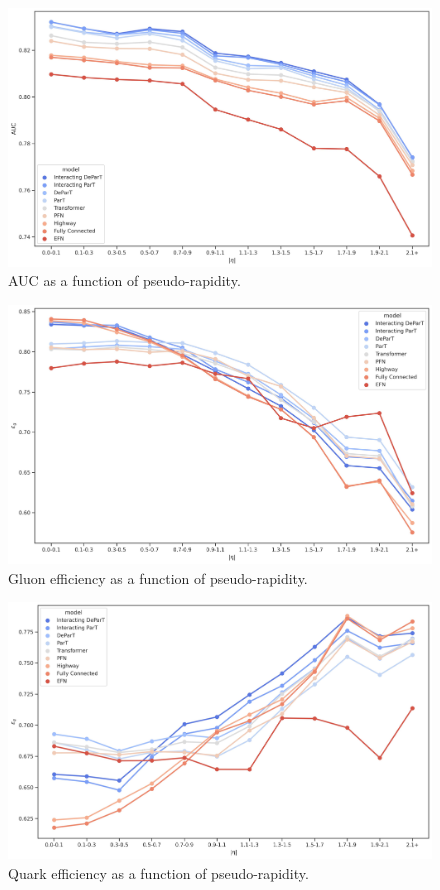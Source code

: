 \begin{figure}[htb]
    \centering
    \includegraphics[width=1\linewidth]{src/plots/results/eta_dep/auc.jpg}
    \caption{AUC as a function of pseudo-rapidity.}
    \label{fig:auc_eta}
\end{figure}

\begin{figure}[htb]
    \centering
    \includegraphics[width=1\linewidth]{src/plots/results/eta_dep/gluon_efficiency.jpg}
    \caption{Gluon efficiency as a function of pseudo-rapidity.}
    \label{fig:gluon_eff_eta}
\end{figure}

\begin{figure}[htb]
    \centering
    \includegraphics[width=1\linewidth]{src/plots/results/eta_dep/quark_efficiency.jpg}
    \caption{Quark efficiency as a function of pseudo-rapidity.}
    \label{fig:quark_eff_eta}
\end{figure}

